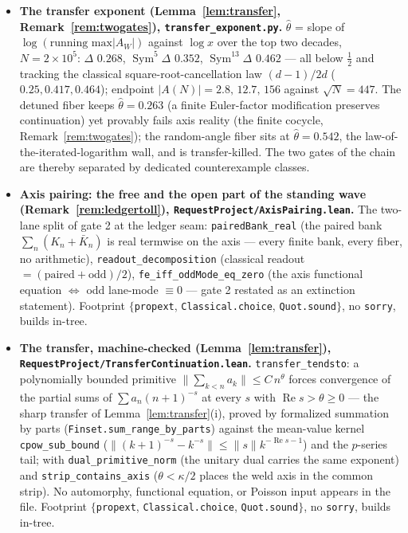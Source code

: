 \documentclass[11pt]{article}
\theoremstyle{definition}
\renewcommand{\Re}{\operatorname{Re}}
\newcommand{\Sym}{\operatorname{Sym}}
\begin{document}
\begin{itemize}
\item \textbf{The transfer exponent (Lemma~\ref{lem:transfer}, Remark~\ref{rem:twogates}),
\texttt{transfer\_exponent.py}.} $\hat\theta$ = slope of $\log(\text{running max}|A_W|)$ against $\log x$
over the top two decades, $N=2\times10^{5}$: $\Delta$ $0.268$, $\Sym^5\Delta$ $0.352$, $\Sym^{13}\Delta$
$0.462$ --- all below $\tfrac12$ and tracking the classical square-root-cancellation law $(d-1)/2d$
($0.25,0.417,0.464$); endpoint $|A(N)|=2.8,\,12.7,\,156$ against $\sqrt N=447$. The detuned fiber keeps
$\hat\theta=0.263$ (a finite Euler-factor modification preserves continuation) yet provably fails axis
reality (the finite cocycle, Remark~\ref{rem:twogates}); the random-angle fiber sits at $\hat\theta=0.542$,
the law-of-the-iterated-logarithm wall, and is transfer-killed. The two gates of the chain are thereby
separated by dedicated counterexample classes.

\item \textbf{Axis pairing: the free and the open part of the standing wave
(Remark~\ref{rem:ledgertoll}), \texttt{RequestProject/AxisPairing.lean}.} The two-lane split of gate 2 at
the ledger seam: \texttt{pairedBank\_real} (the paired bank $\sum_n(K_n+\bar K_n)$ is real termwise on the
axis --- every finite bank, every fiber, no arithmetic), \texttt{readout\_decomposition} (classical readout
$=(\text{paired}+\text{odd})/2$), \texttt{fe\_iff\_oddMode\_eq\_zero} (the axis functional equation
$\Leftrightarrow$ odd lane-mode $\equiv0$ --- gate 2 restated as an extinction statement). Footprint
$\{$\texttt{propext}, \texttt{Classical.choice}, \texttt{Quot.sound}$\}$, no \texttt{sorry}, builds in-tree.

\item \textbf{The transfer, machine-checked (Lemma~\ref{lem:transfer}),
\texttt{RequestProject/TransferContinuation.lean}.} \texttt{transfer\_tendsto}: a polynomially
bounded primitive $\|\sum_{k<n}a_k\|\le C\,n^{\theta}$ forces convergence of the partial sums of
$\sum a_n(n{+}1)^{-s}$ at every $s$ with $\Re s>\theta\ge0$ --- the sharp transfer of
Lemma~\ref{lem:transfer}(i), proved by formalized summation by parts
(\texttt{Finset.sum\_range\_by\_parts}) against the mean-value kernel \texttt{cpow\_sub\_bound}
($\|(k{+}1)^{-s}-k^{-s}\|\le\|s\|k^{-\Re s-1}$) and the $p$-series tail; with
\texttt{dual\_primitive\_norm} (the unitary dual carries the same exponent) and
\texttt{strip\_contains\_axis} ($\theta<\kappa/2$ places the weld axis in the common strip).
No automorphy, functional equation, or Poisson input appears in the file. Footprint
$\{$\texttt{propext}, \texttt{Classical.choice}, \texttt{Quot.sound}$\}$, no \texttt{sorry},
builds in-tree.


\end{itemize}
\end{document}
